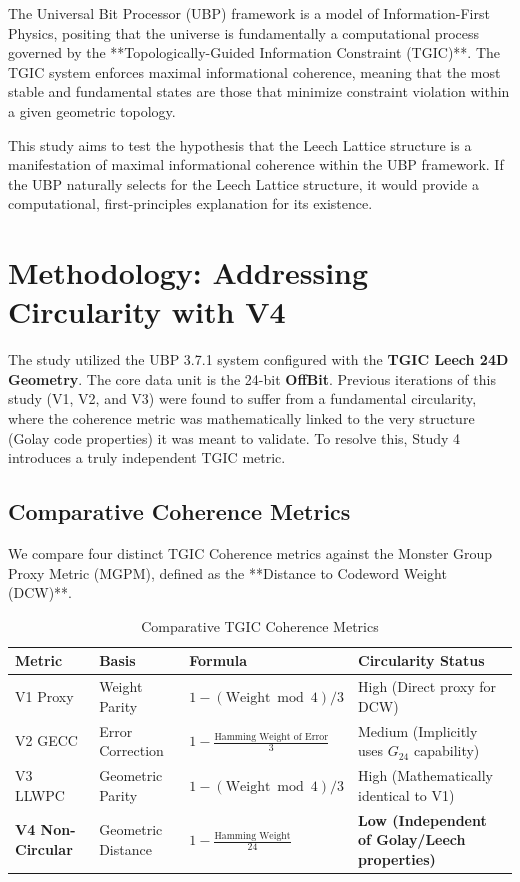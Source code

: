 \documentclass[10pt, a4paper]{article}
\begin{document}
The Universal Bit Processor (UBP) framework is a model of Information-First Physics, positing that the universe is fundamentally a computational process governed by the **Topologically-Guided Information Constraint (TGIC)**. The TGIC system enforces maximal informational coherence, meaning that the most stable and fundamental states are those that minimize constraint violation within a given geometric topology.

This study aims to test the hypothesis that the Leech Lattice structure is a manifestation of maximal informational coherence within the UBP framework. If the UBP naturally selects for the Leech Lattice structure, it would provide a computational, first-principles explanation for its existence.

\section{Methodology: Addressing Circularity with V4}

The study utilized the UBP 3.7.1 system configured with the \textbf{TGIC Leech 24D Geometry}. The core data unit is the 24-bit \textbf{OffBit}. Previous iterations of this study (V1, V2, and V3) were found to suffer from a fundamental circularity, where the coherence metric was mathematically linked to the very structure (Golay code properties) it was meant to validate. To resolve this, Study 4 introduces a truly independent TGIC metric.

\subsection{Comparative Coherence Metrics}

We compare four distinct TGIC Coherence metrics against the Monster Group Proxy Metric (MGPM), defined as the **Distance to Codeword Weight (DCW)**.

\begin{table}[h]
    \centering
    \caption{Comparative TGIC Coherence Metrics}
    \label{tab:metrics}
    \begin{tabular}{llll}
        \toprule
        \textbf{Metric} & \textbf{Basis} & \textbf{Formula} & \textbf{Circularity Status} \\
        \midrule
        V1 Proxy & Weight Parity & $1 - (\text{Weight} \bmod 4) / 3$ & High (Direct proxy for DCW) \\
        V2 GECC & Error Correction & $1 - \frac{\text{Hamming Weight of Error}}{3}$ & Medium (Implicitly uses $G_{24}$ capability) \\
        V3 LLWPC & Geometric Parity & $1 - (\text{Weight} \bmod 4) / 3$ & High (Mathematically identical to V1) \\
        \textbf{V4 Non-Circular} & Geometric Distance & $1 - \frac{\text{Hamming Weight}}{24}$ & \textbf{Low (Independent of Golay/Leech properties)} \\
        \bottomrule
    \end{tabular}
\end{table}
\end{document}
